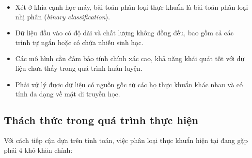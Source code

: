 \begin{itemize}
    \item Xét ở khía cạnh học máy, bài toán phân loại thực khuẩn là bài toán phân loại nhị phân (\textit{binary classification}).
    \item Dữ liệu đầu vào có độ dài và chất lượng không đồng đều, bao gồm cả các trình tự ngắn hoặc có chứa nhiễu sinh học.
    \item Các mô hình cần đảm bảo tính chính xác cao, khả năng khái quát tốt với dữ liệu chưa thấy trong quá trình huấn luyện.
    \item Phải xử lý được dữ liệu có nguồn gốc từ các họ thực khuẩn khác nhau và có tính đa dạng về mặt di truyền học.
\end{itemize}

\subsection{Thách thức trong quá trình thực hiện}
Với cách tiếp cận dựa trên tính toán, việc phân loại thực khuẩn hiện tại đang gặp phải 4 khó khăn chính:
